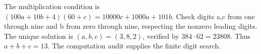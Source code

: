 The multiplication condition is $(100a+10b+4)(60+c)=10000c+1000a+101b$. Check digits a,c from one through nine and b from zero through nine, respecting the nonzero leading digits. The unique solution is $(a,b,c)=(3,8,2)$, verified by $384\cdot62=23808$. Thus $a+b+c=\boxed{13}$. The computation audit supplies the finite digit search.
